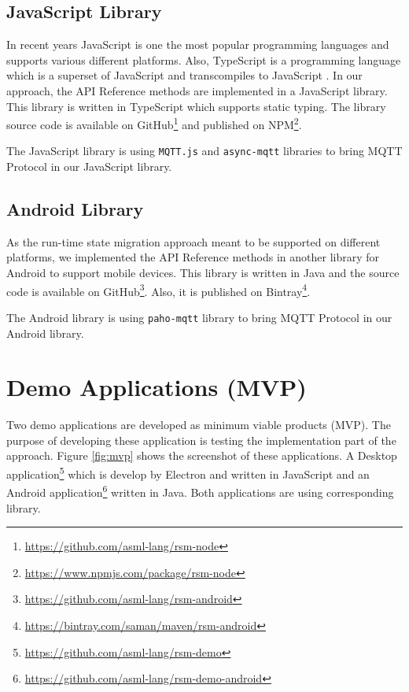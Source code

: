 \subsection{JavaScript Library}
In recent years JavaScript is one the most popular programming languages and supports various different platforms. Also, TypeScript is a programming language which is a superset of JavaScript and transcompiles to JavaScript  \cite{typescript}. In our approach, the API Reference methods are implemented in a JavaScript library. This library is written in TypeScript which supports static typing. The library source code is available on GitHub\footnote{\url{https://github.com/asml-lang/rsm-node}} and published on NPM\footnote{\url{https://www.npmjs.com/package/rsm-node}}.

The JavaScript library is using \lstinline[basicstyle=\ttfamily]{MQTT.js} and \lstinline[basicstyle=\ttfamily]{async-mqtt} libraries to bring MQTT Protocol in our JavaScript library.


\subsection{Android Library}
As the run-time state migration approach meant to be supported on different platforms, we implemented the API Reference methods in another library for Android to support mobile devices. This library is written in Java and
the source code is available on GitHub\footnote{\url{https://github.com/asml-lang/rsm-android}}. Also, it is published on Bintray\footnote{\url{https://bintray.com/saman/maven/rsm-android}}.

The Android library is using \lstinline[basicstyle=\ttfamily]{paho-mqtt} library to bring MQTT Protocol in our Android library.

\section{Demo Applications (MVP)}
Two demo applications are developed as minimum viable products (MVP). The purpose of developing these application is testing the implementation part of the approach. Figure \ref{fig:mvp} shows the screenshot of these applications. A Desktop application\footnote{\url{https://github.com/asml-lang/rsm-demo}} which is develop by Electron and written in JavaScript and an Android application\footnote{\url{https://github.com/asml-lang/rsm-demo-android}} written in Java. Both applications are using corresponding library.

